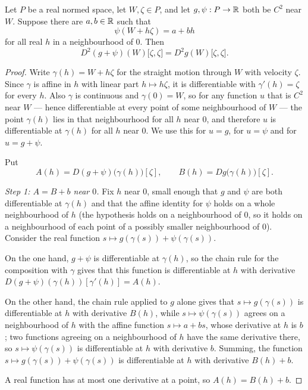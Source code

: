 \begin{lemma}
Let $P$ be a real normed space, let $W,\zeta\in P$, and let $g,\psi:P\to\mathbb{R}$ both be
$C^2$ near $W$. Suppose there are $a,b\in\mathbb{R}$ such that
\[
  \psi(W+h\zeta)=a+bh
\]
for all real $h$ in a neighbourhood of $0$. Then
\[
  D^2(g+\psi)(W)\bigl[\zeta,\zeta\bigr]=D^2g(W)\bigl[\zeta,\zeta\bigr].
\]
\end{lemma}
\begin{proof}
Write $\gamma(h)=W+h\zeta$ for the straight motion through $W$ with velocity $\zeta$.
Since $\gamma$ is affine in $h$ with linear part $h\mapsto h\zeta$, it is differentiable
with $\gamma'(h)=\zeta$ for every $h$. Also $\gamma$ is continuous and $\gamma(0)=W$, so
for any function $u$ that is $C^2$ near $W$ --- hence differentiable at every point of
some neighbourhood of $W$ --- the point $\gamma(h)$ lies in that neighbourhood for all
$h$ near $0$, and therefore $u$ is differentiable at $\gamma(h)$ for all $h$ near $0$.
We use this for $u=g$, for $u=\psi$ and for $u=g+\psi$.

Put
\[
  A(h)=D(g+\psi)\bigl(\gamma(h)\bigr)[\zeta],\qquad
  B(h)=Dg\bigl(\gamma(h)\bigr)[\zeta].
\]

\emph{Step 1: $A=B+b$ near $0$.}
Fix $h$ near $0$, small enough that $g$ and $\psi$ are both differentiable at
$\gamma(h)$ and that the affine identity for $\psi$ holds on a whole neighbourhood of
$h$ (the hypothesis holds on a neighbourhood of $0$, so it holds on a neighbourhood of
each point of a possibly smaller neighbourhood of $0$). Consider the real function
$s\mapsto g(\gamma(s))+\psi(\gamma(s))$.

On the one hand, $g+\psi$ is differentiable at $\gamma(h)$, so the chain rule for the
composition with $\gamma$ gives that this function is differentiable at $h$ with
derivative $D(g+\psi)(\gamma(h))[\gamma'(h)]=A(h)$.

On the other hand, the chain rule applied to $g$ alone gives that $s\mapsto g(\gamma(s))$
is differentiable at $h$ with derivative $B(h)$, while $s\mapsto\psi(\gamma(s))$ agrees
on a neighbourhood of $h$ with the affine function $s\mapsto a+bs$, whose derivative at
$h$ is $b$; two functions agreeing on a neighbourhood of $h$ have the same derivative
there, so $s\mapsto\psi(\gamma(s))$ is differentiable at $h$ with derivative $b$. Summing,
the function $s\mapsto g(\gamma(s))+\psi(\gamma(s))$ is differentiable at $h$ with
derivative $B(h)+b$.

A real function has at most one derivative at a point, so $A(h)=B(h)+b$.


\end{proof}
